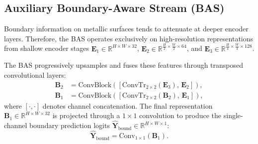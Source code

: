 \documentclass{ieeeaccess}
\begin{document}
\subsection{Auxiliary Boundary-Aware Stream (BAS)}
\label{sec:bas_module}
Boundary information on metallic surfaces tends to attenuate at deeper encoder layers. Therefore, the BAS operates exclusively on high-resolution representations from shallow encoder stages $\mathbf{E}_1 \in \mathbb{R}^{H \times W \times 32}$, $\mathbf{E}_2 \in \mathbb{R}^{\frac{H}{2} \times \frac{W}{2} \times 64}$, and $\mathbf{E}_3 \in \mathbb{R}^{\frac{H}{4} \times \frac{W}{4} \times 128}$.

The BAS progressively upsamples and fuses these features through transposed convolutional layers:
\begin{align}
  \mathbf{B}_2 &= \text{ConvBlock}\left(\left[\text{ConvTr}_{2\times 2}(\mathbf{E}_3), \, \mathbf{E}_2\right]\right), \\
  \mathbf{B}_1 &= \text{ConvBlock}\left(\left[\text{ConvTr}_{2\times 2}(\mathbf{B}_2), \, \mathbf{E}_1\right]\right),
\end{align}
where $[\cdot, \cdot]$ denotes channel concatenation. The final representation $\mathbf{B}_1 \in \mathbb{R}^{H \times W \times 32}$ is projected through a $1 \times 1$ convolution to produce the single-channel boundary prediction logits $\hat{\mathbf{Y}}_{\text{bound}} \in \mathbb{R}^{H \times W \times 1}$:
\begin{equation}
  \hat{\mathbf{Y}}_{\text{bound}} = \text{Conv}_{1 \times 1}(\mathbf{B}_1).
\end{equation}
\end{document}
